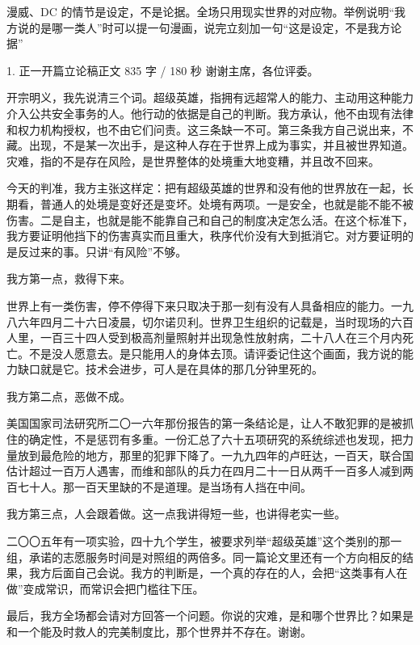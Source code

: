 \documentclass[script,pro]{debate}
\begin{document}
\debatetitle
\begin{thesisbox}[证据纪律]漫威、DC 的情节是设定，不是论据。全场只用现实世界的对应物。举例说明“我方说的是哪一类人”时可以提一句漫画，说完立刻加一句“这是设定，不是我方论据”\end{thesisbox}
\begin{speech}{1. 正一开篇立论稿}{正文 835 字 / 180 秒}
谢谢主席，各位评委。

开宗明义，我先说清三个词。超级英雄，指拥有远超常人的能力、主动用这种能力介入公共安全事务的人。他行动的依据是自己的判断。我方承认，他不由现有法律和权力机构授权，也不由它们问责。这三条缺一不可。第三条我方自己说出来，不藏。出现，不是某一次出手，是这种人存在于世界上成为事实，并且被世界知道。灾难，指的不是存在风险，是世界整体的处境重大地变糟，并且改不回来。

今天的判准，我方主张这样定：把有超级英雄的世界和没有他的世界放在一起，长期看，普通人的处境是变好还是变坏。处境有两项。一是安全，也就是能不能不被伤害。二是自主，也就是能不能靠自己和自己的制度决定怎么活。在这个标准下，我方要证明他挡下的伤害真实而且重大，秩序代价没有大到抵消它。对方要证明的是反过来的事。只讲“有风险”不够。

我方第一点，救得下来。

世界上有一类伤害，停不停得下来只取决于那一刻有没有人具备相应的能力。一九八六年四月二十六日凌晨，切尔诺贝利。世界卫生组织的记载是，当时现场的六百人里，一百三十四人受到极高剂量照射并出现急性放射病，二十八人在三个月内死亡。不是没人愿意去。是只能用人的身体去顶。请评委记住这个画面，我方说的能力缺口就是它。技术会进步，可人是在具体的那几分钟里死的。

我方第二点，恶做不成。

美国国家司法研究所二〇一六年那份报告的第一条结论是，让人不敢犯罪的是被抓住的确定性，不是惩罚有多重。一份汇总了六十五项研究的系统综述也发现，把力量放到最危险的地方，那里的犯罪下降了。一九九四年的卢旺达，一百天，联合国估计超过一百万人遇害，而维和部队的兵力在四月二十一日从两千一百多人减到两百七十人。那一百天里缺的不是道理。是当场有人挡在中间。

我方第三点，人会跟着做。这一点我讲得短一些，也讲得老实一些。

二〇〇五年有一项实验，四十九个学生，被要求列举“超级英雄”这个类别的那一组，承诺的志愿服务时间是对照组的两倍多。同一篇论文里还有一个方向相反的结果，我方后面自己会说。我方的判断是，一个真的存在的人，会把“这类事有人在做”变成常识，而常识会把门槛往下压。

最后，我方全场都会请对方回答一个问题。你说的灾难，是和哪个世界比？如果是和一个能及时救人的完美制度比，那个世界并不存在。谢谢。

\begin{contingency}
\end{contingency}
\end{speech}
\end{document}
